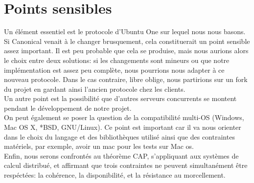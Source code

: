 \section{Points sensibles}
\thispagestyle{EIP} %

Un élément essentiel est le protocole d'Ubuntu One sur lequel nous nous basons. Si Canonical venait à le changer brusquement, cela constituerait un point sensible assez important. Il est peu probable que cela se produise, mais nous aurions alors le choix entre deux solutions: si les changements sont mineurs ou que notre implémentation est assez peu complète, nous pourrions nous adapter à ce nouveau protocole. Dans le cas contraire, libre oblige, nous partirions sur un fork du projet en gardant ainsi l'ancien protocole chez les clients.\\

Un autre point est la possibilité que d'autres serveurs concurrents se montent pendant le développement de notre projet.\\

On peut également se poser la question de la compatibilité multi-OS (Windows, Mac OS X, *BSD, GNU/Linux). Ce point est important car il va nous orienter dans le choix du langage et des bibliothèques utilisé ainsi que des contraintes matériels, par exemple, avoir un mac pour les tests sur Mac os.\\

Enfin, nous serons confrontés au théorème CAP, s'appliquant aux systèmes de calcul distribué, et affirmant que trois contraintes ne peuvent simultanément être respéctées: la cohérence, la disponibilité, et la résistance au morcellement.
